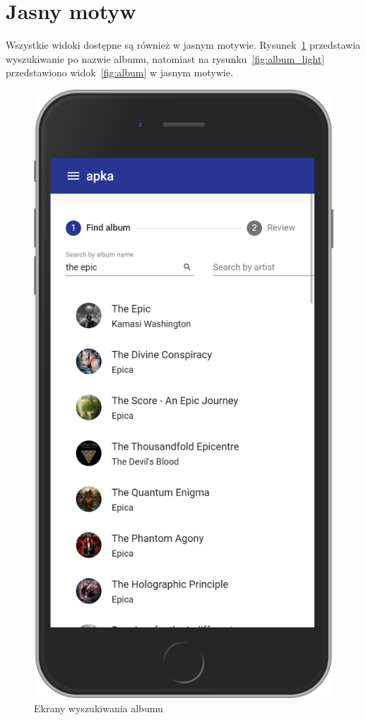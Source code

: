 \section{Jasny motyw}
	Wszystkie widoki dostępne są również w jasnym motywie.
	Rysunek~\ref{fig:search_light} przedstawia wyszukiwanie po nazwie albumu,
	natomiast na rysunku~\ref{fig:album_light} przedstawiono widok~\ref{fig:album} w jasnym motywie.
	\begin{figure}[H]
		\centering
		\begin{minipage}{.5\textwidth}
			\centering
			\includegraphics[width=0.75\linewidth]{rys06/search_light.png}
			\caption{Ekrany wyszukiwania albumu}
			\label{fig:search_light}
		\end{minipage}%
		\begin{minipage}{0.5\textwidth}

\end{minipage}
\end{figure}
